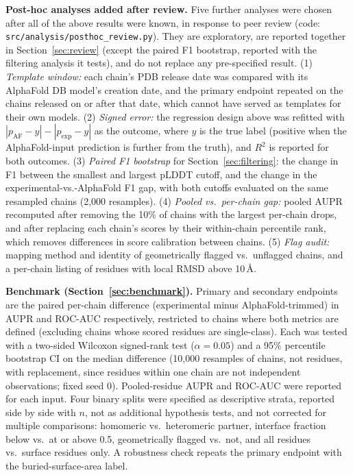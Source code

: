 \documentclass[10pt]{article}
\begin{document}
\textbf{Post-hoc analyses added after review.} Five further analyses were
chosen after all of the above results were known, in response to peer
review (code: \texttt{src/analysis/posthoc\_review.py}). They are
exploratory, are reported together in Section~\ref{sec:review} (except the
paired F1 bootstrap, reported with the filtering analysis it tests), and do
not replace any pre-specified result. (1) \emph{Template window:} each chain's
PDB release date was compared with its AlphaFold DB model's creation date,
and the primary endpoint repeated on the chains released on or after that
date, which cannot have served as templates for their own models. (2)
\emph{Signed error:} the regression design above was refitted with
$|p_{\mathrm{AF}} - y| - |p_{\mathrm{exp}} - y|$ as the outcome, where $y$
is the true label (positive when the AlphaFold-input prediction is further
from the truth), and $R^2$ is reported for both outcomes. (3) \emph{Paired
F1 bootstrap} for Section~\ref{sec:filtering}: the change in F1 between the
smallest and largest pLDDT cutoff, and the change in the
experimental-vs.-AlphaFold F1 gap, with both cutoffs evaluated on the same
resampled chains (2,000 resamples). (4) \emph{Pooled vs.\
per-chain gap:} pooled AUPR recomputed after removing the
10\% of chains with the largest per-chain drops, and after
replacing each chain's scores by their within-chain percentile rank, which
removes differences in score calibration between chains. (5) \emph{Flag
audit:} mapping method and identity of geometrically flagged vs.\ unflagged
chains, and a per-chain listing of residues with local RMSD above
10\,\r{A}.

\textbf{Benchmark (Section~\ref{sec:benchmark}).} Primary and secondary
endpoints are the paired per-chain difference (experimental minus
AlphaFold-trimmed) in AUPR and ROC-AUC respectively, restricted to chains
where both metrics are defined (excluding chains whose scored residues are
single-class). Each was tested with a two-sided Wilcoxon signed-rank test
($\alpha = 0.05$) and a 95\% percentile bootstrap CI on the median difference
(10,000 resamples of chains, not residues, with replacement, since
residues within one chain are not independent observations; fixed seed
0). Pooled-residue AUPR and ROC-AUC were reported for each
input. Four binary splits were specified as descriptive strata, reported
side by side with $n$, not as additional hypothesis tests, and not corrected
for multiple comparisons: homomeric vs.\ heteromeric partner, interface
fraction below vs.\ at or above 0.5,
geometrically flagged vs.\ not, and all residues vs.\ surface residues
only. A robustness check repeats the primary endpoint with the
buried-surface-area label.
\end{document}
